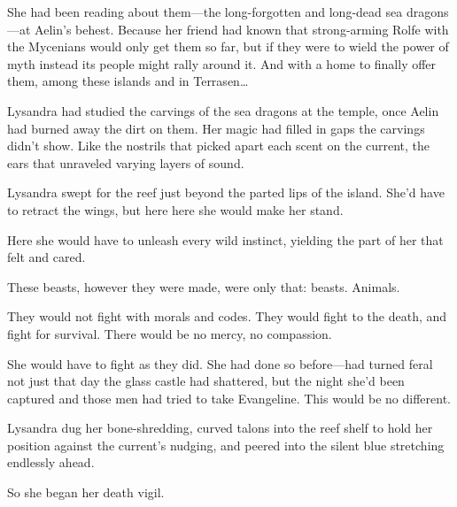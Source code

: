 She had been reading about them---the long-forgotten and long-dead sea dragons---at Aelin's behest. Because her friend had known that strong-arming Rolfe with the Mycenians would only get them so far, but if they were to wield the power of myth instead  its people might rally around it. And with a home to finally offer them, among these islands and in Terrasen\ldots{}

Lysandra had studied the carvings of the sea dragons at the temple, once Aelin had burned away the dirt on them. Her magic had filled in gaps the carvings didn't show. Like the nostrils that picked apart each scent on the current, the ears that unraveled varying layers of sound.

Lysandra swept for the reef just beyond the parted lips of the island. She'd have to retract the wings, but here  here she would make her stand.

Here she would have to unleash every wild instinct, yielding the part of her that felt and cared.

These beasts, however they were made, were only that: beasts. Animals.

They would not fight with morals and codes. They would fight to the death, and fight for survival. There would be no mercy, no compassion.

She would have to fight as they did. She had done so before---had turned feral not just that day the glass castle had shattered, but the night she'd been captured and those men had tried to take Evangeline. This would be no different.

Lysandra dug her bone-shredding, curved talons into the reef shelf to hold her position against the current's nudging, and peered into the silent blue stretching endlessly ahead.

So she began her death vigil.
